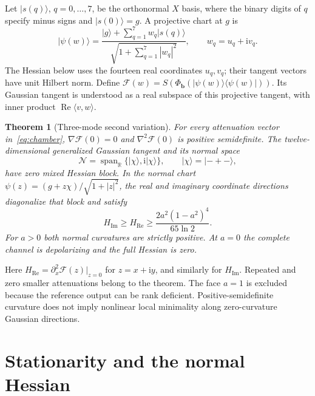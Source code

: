 \documentclass[11pt,a4paper]{article}
\newcommand{\ket}[1]{\lvert #1\rangle}
\newcommand{\bra}[1]{\langle #1\rvert}
\newcommand{\ii}{\mathrm{i}}
\newcommand{\Ree}{\operatorname{Re}}
\newcommand{\Imm}{\operatorname{Im}}
\newcommand{\PhiB}{\Phi_{\boldsymbol b}}
\newtheorem{theorem}{Theorem}
\begin{document}
Let $\ket{s(q)}$, $q=0,\ldots,7$, be the orthonormal $X$ basis,
where the binary digits of $q$ specify minus signs and $\ket{s(0)}=g$.
A projective chart at $g$ is
\begin{equation}
 \ket{\psi(w)}=
 \frac{\ket g+\sum_{q=1}^7w_q\ket{s(q)}}
 {\sqrt{1+\sum_{q=1}^7|w_q|^2}},\qquad w_q=u_q+\ii v_q.
 \label{eq:chart}
\end{equation}
The Hessian below uses the fourteen real coordinates $u_q,v_q$;
their tangent vectors have unit Hilbert norm. Define
$\mathcal F(w)=S(\PhiB(\ket{\psi(w)}\bra{\psi(w)}))$.
Its Gaussian tangent is understood as a real subspace of this
projective tangent, with inner product $\Ree\langle v,w\rangle$.

\begin{theorem}[Three-mode second variation]\label{thm:main}
For every attenuation vector in~\eqref{eq:chamber},
$\nabla\mathcal F(0)=0$ and $\nabla^2\mathcal F(0)$ is positive
semidefinite. The twelve-dimensional generalized Gaussian tangent
and its normal space
\begin{equation}
 \mathcal N=\operatorname{span}_{\mathbb R}
 \{\ket\chi,\ii\ket\chi\},\qquad \ket\chi=\ket{-+-},
 \label{eq:normal}
\end{equation}
have zero mixed Hessian block. In the normal chart
$\psi(z)=(g+z\chi)/\sqrt{1+|z|^2}$, the real and imaginary
coordinate directions diagonalize that block and satisfy
\begin{equation}
 H_{\Imm}\ge H_{\Ree}\ge
 \frac{2a^2(1-a^2)^4}{65\ln2}.\label{eq:bound}
\end{equation}
For $a>0$ both normal curvatures are strictly positive. At $a=0$
the complete channel is depolarizing and the full Hessian is zero.
\end{theorem}

Here $H_{\Ree}=\partial_x^2\mathcal F(z)|_{z=0}$ for $z=x+\ii y$,
and similarly for $H_{\Imm}$. Repeated and zero smaller attenuations
belong to the theorem. The face $a=1$ is excluded because the
reference output can be rank deficient. Positive-semidefinite curvature
does not imply nonlinear local minimality along zero-curvature
Gaussian directions.

\section{Stationarity and the normal Hessian}
\end{document}
